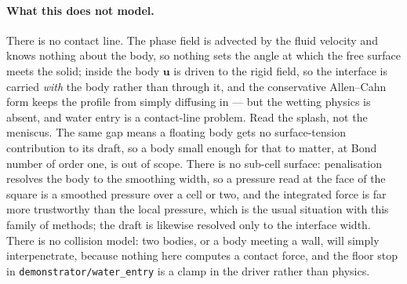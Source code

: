 \documentclass[11pt,a4paper]{article}
\newcommand{\code}[1]{\texttt{\small #1}}
\newcommand{\uu}{\bm{u}}
\begin{document}
\paragraph{What this does not model.} There is no contact line. The phase field is
advected by the fluid velocity and knows nothing about the body, so nothing sets
the angle at which the free surface meets the solid; inside the body $\uu$ is
driven to the rigid field, so the interface is carried \emph{with} the body rather
than through it, and the conservative Allen--Cahn form keeps the profile from
simply diffusing in --- but the wetting physics is absent, and water entry is a
contact-line problem. Read the splash, not the meniscus. The same gap means a
floating body gets no surface-tension contribution to its draft, so a body small
enough for that to matter, at Bond number of order one, is out of scope. There is
no sub-cell surface: penalisation resolves the body to the smoothing width, so a
pressure read at the face of the square is a smoothed pressure over a cell or two,
and the integrated force is far more trustworthy than the local pressure, which is
the usual situation with this family of methods; the draft is likewise resolved
only to the interface width. There is no collision model: two bodies, or a body
meeting a wall, will simply interpenetrate, because nothing here computes a
contact force, and the floor stop in \code{demonstrator/water\_entry} is a clamp in
the driver rather than physics.
\end{document}
